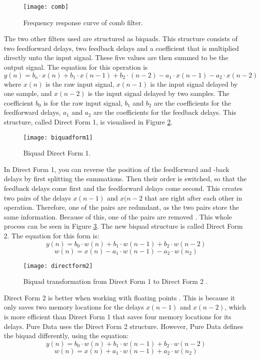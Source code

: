 \begin{figure}
\centering
\texttt{[image: comb]}
\caption{Frequency response curve of comb filter.}
\label{fig:comb}
\end{figure}

The two other filters used are structured as biquads. This structure consists of two feedforward delays, two feedback delays and a coefficient that is multiplied directly unto the input signal. These five values are then summed to be the output signal. The equation for this operation is 
\[y(n) = b_o \cdot x(n) + b_1 \cdot x(n-1) + b_2 \cdot (n-2) - a_1 \cdot x(n-1) - a_2 \cdot x(n-2)\] \cite{Redmon2003}
where \(x(n)\) is the raw input signal, \(x(n-1)\) is the input signal delayed by one sample, and \(x(n-2)\) is the input signal delayed by two samples. The coefficient \(b_0\) is for the raw input signal, \(b_1\) and \(b_2\) are the coefficients for the feedforward delays, \(a_1\) and \(a_2\) are the coefficients for the feedback delays. This structure, called Direct Form 1, is visualised in Figure \ref{fig:biquadform1}.

\begin{figure}
\centering
\texttt{[image: biquadform1]}
\caption{Biquad Direct Form 1.}
\label{fig:biquadform1}
\end{figure}

In Direct Form 1, you can reverse the position of the feedforward and -back delays by first splitting the summations. Then their order is switched, so that the feedback delays come first and the feedforward delays come second. This creates two pairs of the delays \(x(n-1)\) and \(x(n-2\) that are right after each other in operation. Therefore, one of the pairs are redundant, as the two pairs store the same information. Because of this, one of the pairs are removed \cite{Redmon2003}. This whole process can be seen in Figure \ref{fig:biquadtransform}. The new biquad structure is called Direct Form 2. The equation for this form is\cite{Nederland2016}:
\[y(n) = b_0 \cdot w(n) + b_1 \cdot w(n-1) + b_2 \cdot w(n-2)\]
\[w(n) = x(n) - a_1 \cdot w(n-1) - a_2 \cdot w(n_2)\]

\begin{figure}
\centering
\texttt{[image: directform2]}
\caption{Biquad transformation from Direct Form 1 to Direct Form 2 \cite{Redmon2003}.}
\label{fig:biquadtransform}
\end{figure}

Direct Form 2 is better when working with floating points \cite{Redmon2003}. This is because it only saves two memory locations for the delays \(x(n-1)\) and \(x(n-2)\), which is more efficient than Direct Form 1 that saves four memory locations for its delays. Pure Data uses the Direct Form 2 structure. However, Pure Data defines the biquad differently, using the equation:
\[y(n) = b_0 \cdot w(n) + b_1 \cdot w(n-1) + b_2 \cdot w(n-2)\]
\[w(n) = x(n) + a_1 \cdot w(n-1) + a_2 \cdot w(n_2)\]

